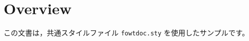 \documentclass[10pt,letterpaper]{jsarticle}
\begin{document}
\pagestyle{fancy}
\tableofcontents
\clearpage

\section{Overview}
この文書は，共通スタイルファイル \texttt{fowtdoc.sty} を使用したサンプルです。
\end{document}
